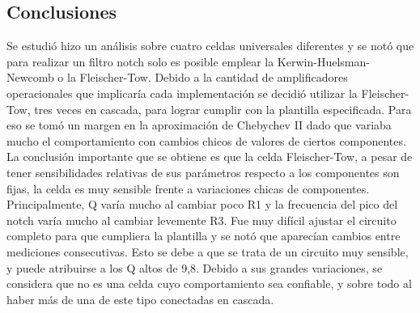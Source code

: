 \subsection{Conclusiones} 
Se estudi\'o hizo un an\'alisis sobre cuatro celdas universales diferentes y se not\'o que para realizar un filtro notch solo es posible emplear la Kerwin-Huelsman-Newcomb o la Fleischer-Tow. Debido a la cantidad de amplificadores operacionales que implicar\'ia cada implementaci\'on se decidi\'o utilizar la Fleischer-Tow, tres veces en cascada, para lograr cumplir con la plantilla especificada. Para eso se tom\'o un margen en la aproximaci\'on de Chebychev II dado que variaba mucho el comportamiento con cambios chicos de valores de ciertos componentes. La conclusi\'on importante que se obtiene es que la celda Fleischer-Tow, a pesar de tener sensibilidades relativas de sus par\'ametros respecto a los componentes son fijas, la celda es muy sensible frente a variaciones chicas de componentes. Principalmente, Q var\'ia mucho al cambiar poco R1 y la frecuencia del pico del notch var\'ia mucho al cambiar levemente R3. Fue muy dif\'icil ajustar el circuito completo para que cumpliera la plantilla y se not\'o que aparec\'ian cambios entre mediciones consecutivas. Esto se debe a que se trata de un circuito muy sensible, y puede atribuirse a los Q altos de 9,8. Debido a sus grandes variaciones, se considera que no es una celda cuyo comportamiento sea confiable, y sobre todo al haber m\'as de una de este tipo conectadas en cascada. 


